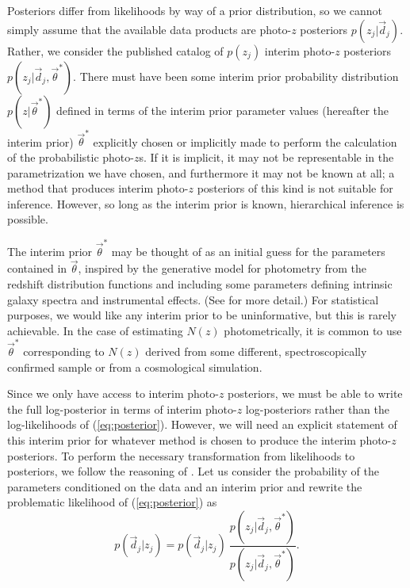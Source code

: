 \documentclass[preprint]{aastex}
\begin{document}
Posteriors differ from likelihoods by way of a prior distribution, so we cannot 
simply assume that the available data products are photo-$z$ posteriors 
$p(z_{j}|\vec{d}_{j})$.  Rather, we consider the published catalog of 
$p(z_{j})$ interim photo-$z$ posteriors 
$p(z_{j}|\vec{d}_{j},\vec{\theta}^{*})$.  There must have been some interim 
prior probability distribution $p(z|\vec{\theta}^{*})$ defined in terms of the 
interim prior parameter values (hereafter the interim prior) $\vec{\theta}^{*}$ 
explicitly chosen or implicitly made to perform the calculation of the 
probabilistic photo-$z$s.  If it is implicit, it may not be representable in 
the parametrization we have chosen, and furthermore it may not be known at all; 
a method that produces interim photo-$z$ posteriors of this kind is not 
suitable for inference.  However, so long as the interim prior is known, 
hierarchical inference is possible. 

The interim prior $\vec{\theta}^{*}$ may be thought of as an initial guess for 
the parameters contained in $\vec{\theta}$, inspired by the generative model 
for photometry from the redshift distribution functions and including some 
parameters defining intrinsic galaxy spectra and instrumental effects. (See 
\citealt{Benitez2000} for more detail.)  For statistical purposes, we would 
like any interim prior to be uninformative, but this is rarely achievable.  In 
the case of estimating $N(z)$ photometrically, it is common to use 
$\vec{\theta}^{*}$ corresponding to $N(z)$ derived from some different, 
spectroscopically confirmed sample or from a cosmological simulation.

Since we only have access to interim photo-$z$ posteriors, we must be able to 
write the full log-posterior in terms of interim photo-$z$ log-posteriors 
rather than the log-likelihoods of (\ref{eq:posterior}).  However, we will need 
an explicit statement of this interim prior for whatever method is chosen to 
produce the interim photo-$z$ posteriors.  To perform the necessary 
transformation from likelihoods to posteriors, we follow the reasoning of 
\citet{Foreman-Mackey2014}.  Let us consider the probability of the parameters 
conditioned on the data and an interim prior and rewrite the problematic 
likelihood of (\ref{eq:posterior}) as 
\begin{equation}
\label{eq:trick}
p(\vec{d}_{j}|z_{j}) = p(\vec{d}_{j}|z_{j})\ 
\frac{p(z_{j}|\vec{d}_{j},\vec{\theta}^{*})}{p(z_{j}|\vec{d}_{j},\vec{\theta}^{*
})}.
\end{equation}
\end{document}
